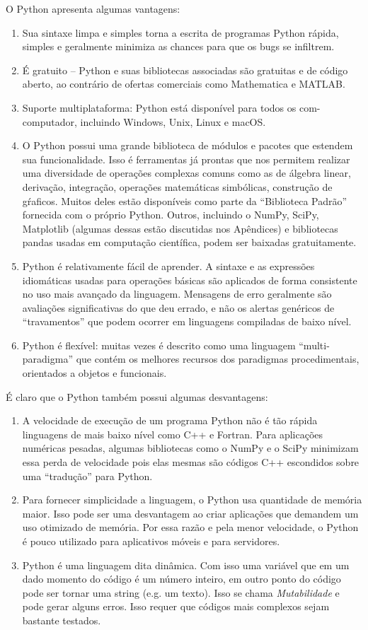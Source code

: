 O Python apresenta algumas vantagens:
\begin{enumerate}
    \item Sua sintaxe limpa e simples torna a escrita de programas Python rápida, simples e geralmente minimiza as chances para que os bugs se infiltrem.
    \item É gratuito – Python e suas bibliotecas  associadas são gratuitas e de código aberto, ao contrário de ofertas comerciais como Mathematica e MATLAB.
    \item Suporte multiplataforma: Python está disponível para todos os com-
computador, incluindo Windows, Unix, Linux e macOS.
    \item O Python possui uma grande biblioteca de módulos e pacotes que estendem sua funcionalidade. Isso é ferramentas já prontas que nos permitem realizar uma diversidade de operações complexas comuns como as de álgebra linear, derivação, integração, operações matemáticas simbólicas, construção de gŕaficos. Muitos deles estão disponíveis como parte da “Biblioteca Padrão” fornecida com o próprio Python. Outros, incluindo o NumPy, SciPy, Matplotlib (algumas dessas estão discutidas nos Apêndices) e bibliotecas pandas usadas em computação científica, podem ser baixadas gratuitamente.
    \item Python é relativamente fácil de aprender. A sintaxe e as expressões idiomáticas usadas para operações básicas são aplicados de forma consistente no uso mais avançado da linguagem. Mensagens de erro geralmente são avaliações significativas do que deu errado, e não os alertas genéricos de “travamentos” que podem ocorrer em linguagens compiladas de baixo nível.
    \item Python é flexível: muitas vezes é descrito como uma linguagem “multi-paradigma” que contém os melhores recursos dos paradigmas procedimentais, orientados a objetos e funcionais.
\end{enumerate}

É claro que o Python também possui algumas desvantagens:
\begin{enumerate}
    \item A velocidade de execução de um programa Python não é tão rápida linguagens de mais baixo nível como C++ e Fortran. Para aplicações numéricas pesadas, algumas bibliotecas como o NumPy e o SciPy minimizam essa perda de velocidade pois elas mesmas são códigos C++ escondidos sobre uma ``tradução'' para Python. 
    \item Para fornecer simplicidade a linguagem, o Python usa quantidade de memória maior. Isso pode ser uma desvantagem ao criar aplicações que demandem um uso otimizado de memória. Por essa razão e pela menor velocidade, o Python é pouco utilizado para aplicativos móveis e para servidores.
    \item Python é uma linguagem dita dinâmica. Com isso uma variável que em um dado momento do código é um número inteiro, em outro ponto do código pode ser tornar uma string (e.g. um texto). Isso se chama {\it Mutabilidade} e pode gerar alguns erros. Isso requer que códigos mais complexos sejam bastante testados.
\end{enumerate}

